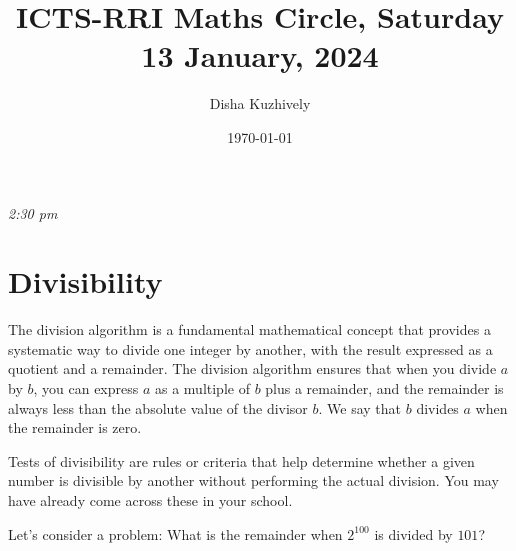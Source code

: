 \documentclass[a4paper,12pt]{article}
\title{ICTS-RRI Maths Circle, Saturday 13 January, 2024}
\author{Disha Kuzhively}
\date{\today}
\begin{document}
\maketitle
\emph{2:30 pm}
\section*{Divisibility}
The division algorithm is a fundamental mathematical concept that provides a systematic way to divide one integer by another, with the result expressed as a quotient and a remainder. The division algorithm ensures that when you divide $a$ by $b$, you can express $a$ as a multiple of $b$ plus a remainder, and the remainder is always less than the absolute value of the divisor $b$. We say that $b$ divides $a$ when the remainder is zero.

Tests of divisibility are rules or criteria that help determine whether a given number is divisible by another without performing the actual division. You may have already come across these in your school.

Let's consider a problem: What is the remainder when $2^{100}$ is divided by $101$?
\end{document}
